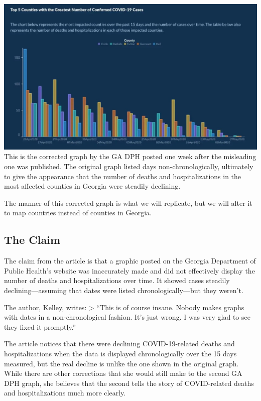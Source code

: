 \documentclass[
]{article}
\begin{document}
\includegraphics[width=17.74in]{original_graphs/covid19_in_georgia} This
is the corrected graph by the GA DPH posted one week after the
misleading one was published. The original graph listed days
non-chronologically, ultimately to give the appearance that the number
of deaths and hospitalizations in the most affected counties in Georgia
were steadily declining.

The manner of this corrected graph is what we will replicate, but we
will alter it to map countries instead of counties in Georgia.

\hypertarget{the-claim}{%
\subsection{The Claim}\label{the-claim}}

The claim from the article is that a graphic posted on the Georgia
Department of Public Health's website was inaccurately made and did not
effectively display the number of deaths and hospitalizations over time.
It showed cases steadily declining---assuming that dates were listed
chronologically---but they weren't.

The author, Kelley, writes: \textgreater{} ``This is of course insane.
Nobody makes graphs with dates in a non-chronological fashion. It's just
wrong. I was very glad to see they fixed it promptly.''

The article notices that there were declining COVID-19-related deaths
and hospitalizations when the data is displayed chronologically over the
15 days measured, but the real decline is unlike the one shown in the
original graph. While there are other corrections that she would still
make to the second GA DPH graph, she believes that the second tells the
story of COVID-related deaths and hospitalizations much more clearly.
\end{document}

